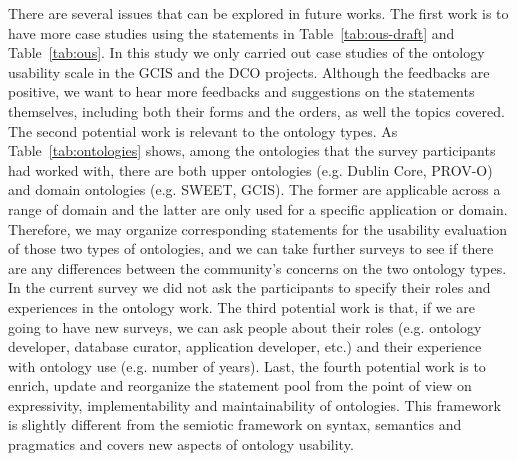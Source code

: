 There are several issues that can be explored in future works. The first work is to have more case studies using the statements in Table~\ref{tab:ous-draft} and Table~\ref{tab:ous}. In this study we only carried out case studies of the ontology usability scale in the GCIS and the DCO projects. Although the feedbacks are positive, we want to hear more feedbacks and suggestions on the statements themselves, including both their forms and the orders, as well the topics covered. The second potential work is relevant to the ontology types. As Table~\ref{tab:ontologies} shows, among the ontologies that the survey participants had worked with, there are both upper ontologies (e.g. Dublin Core, PROV-O) and domain ontologies (e.g. SWEET, GCIS). The former are applicable across a range of domain and the latter are only used for a specific application or domain. Therefore, we may organize corresponding statements for the usability evaluation of those two types of ontologies, and we can take further surveys to see if there are any differences between the community's concerns on the two ontology types. In the current survey we did not ask the participants to specify their roles and experiences in the ontology work. The third potential work is that, if we are going to have new surveys, we can ask people about their roles (e.g. ontology developer, database curator, application developer, etc.) and their experience with ontology use (e.g. number of years). Last, the fourth potential work is to enrich, update and reorganize the statement pool from the point of view on expressivity, implementability and maintainability of ontologies. This framework is slightly different from the semiotic framework on syntax, semantics and pragmatics and covers new aspects of ontology usability.

